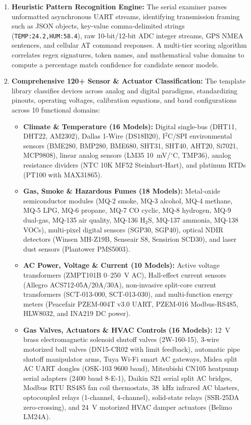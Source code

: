 \documentclass[12pt,a4paper]{article}
\begin{document}
\begin{enumerate}
    \item \textbf{Heuristic Pattern Recognition Engine:} The serial examiner parses unformatted asynchronous UART streams, identifying transmission framing such as JSON objects, key-value comma-delimited strings (\texttt{TEMP:24.2,HUM:58.4}), raw 10-bit/12-bit ADC integer streams, GPS NMEA sentences, and cellular AT command responses. A multi-tier scoring algorithm correlates regex signatures, token names, and mathematical value domains to compute a percentage match confidence for candidate sensor models.
    
    \item \textbf{Comprehensive 120+ Sensor \& Actuator Classification:} The template library classifies devices across analog and digital paradigms, standardizing pinouts, operating voltages, calibration equations, and baud configurations across 10 functional domains:
    \begin{itemize}
        \item \textbf{Climate \& Temperature (16 Models):} Digital single-bus (DHT11, DHT22, AM2302), Dallas 1-Wire (DS18B20), I$^2$C/SPI environmental sensors (BME280, BMP280, BME680, SHT31, SHT40, AHT20, Si7021, MCP9808), linear analog sensors (LM35 10~mV/$^\circ$C, TMP36), analog resistance dividers (NTC 10K MF52 Steinhart-Hart), and platinum RTDs (PT100 with MAX31865).
        \item \textbf{Gas, Smoke \& Hazardous Fumes (18 Models):} Metal-oxide semiconductor modules (MQ-2 smoke, MQ-3 alcohol, MQ-4 methane, MQ-5 LPG, MQ-6 propane, MQ-7 CO cyclic, MQ-8 hydrogen, MQ-9 dual-gas, MQ-135 air quality, MQ-136 H$_2$S, MQ-137 ammonia, MQ-138 VOCs), multi-pixel digital sensors (SGP30, SGP40), optical NDIR detectors (Winsen MH-Z19B, Senseair S8, Sensirion SCD30), and laser dust sensors (Plantower PMS5003).
        \item \textbf{AC Power, Voltage \& Current (10 Models):} Active voltage transformers (ZMPT101B 0--250~V AC), Hall-effect current sensors (Allegro ACS712-05A/20A/30A), non-invasive split-core current transformers (SCT-013-000, SCT-013-030), and multi-function energy meters (Peacefair PZEM-004T v3.0 UART, PZEM-016 Modbus-RS485, HLW8032, and INA219 DC power).
        \item \textbf{Gas Valves, Actuators \& HVAC Controls (16 Models):} 12~V brass electromagnetic solenoid shutoff valves (2W-160-15), 3-wire motorized ball valves (DN15-CR02 with limit feedback), automatic pipe shutoff manipulator arms, Tuya Wi-Fi smart AC gateways, Midea split AC UART dongles (OSK-103 9600 baud), Mitsubishi CN105 heatpump serial adapters (2400 baud 8-E-1), Daikin S21 serial split AC bridges, Modbus RTU RS485 fan coil thermostats, 38~kHz infrared AC blasters, optocoupled relays (1-channel, 4-channel), solid-state relays (SSR-25DA zero-crossing), and 24~V motorized HVAC damper actuators (Belimo LM24A).

\end{itemize}
\end{enumerate}
\end{document}
